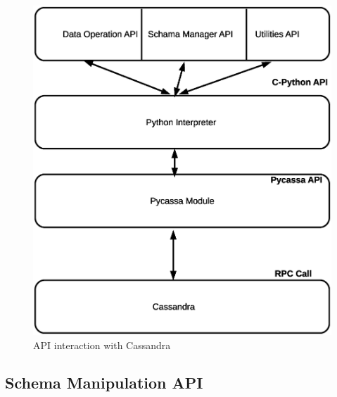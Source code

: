       \begin{figure}[htb]
	 \centering
         \includegraphics[scale=0.3]{C_client.eps}
         \caption{API interaction with Cassandra }
      \end{figure}
      

      \subsection{Schema Manipulation API}
